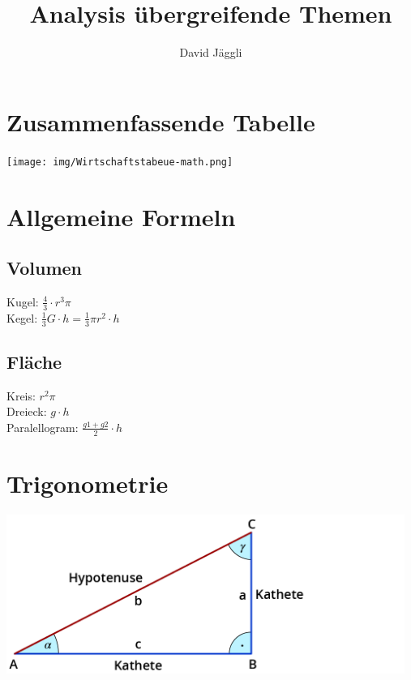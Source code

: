 \documentclass[12pt]{scrartcl}
\author{David Jäggli}
\title{Analysis übergreifende Themen}
\begin{document}
\maketitle

\tableofcontents

\section{Zusammenfassende Tabelle}
\begin{center}
\texttt{[image: img/Wirtschaftstabeue-math.png]}
\end{center}

\newpage
\section{Allgemeine Formeln}
\subsection{Volumen}
Kugel: $\frac{4}{3} \cdot r^3 \pi$ \\
Kegel: $\frac{1}{3}G \cdot h = \frac{1}{3} \pi r^2 \cdot h$

\subsection{Fläche}
Kreis: $r^2 \pi $\\
Dreieck: $g \cdot h$\\
Paralellogram: $\frac{g1 + g2}{2} \cdot h$


\newpage
\section{Trigonometrie}

\begin{center}
    \includegraphics[width=13cm]{img/rechtw_dreieck.png}\\
\end{center}
\end{document}
